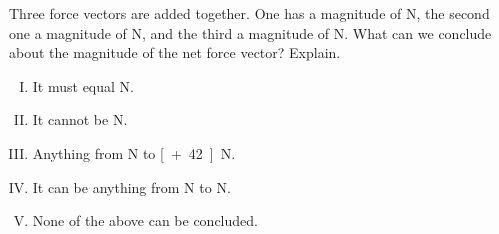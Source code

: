 \label{fnt6.1.2-1}Three force vectors are added together. One has a magnitude of \unit[9]{N}, the second one a magnitude of \unit[18]{N}, and the third a magnitude of \unit[15]{N}. What can we conclude about the magnitude of the net force vector?  Explain.

\begin{enumerate}[I.]
	\item It must equal \unit[42]{N}.
	
	\item It cannot be \unit[0]{N}.
	
	\item Anything from \unit[-42]{N} to \unit[+42]{N}.
	
	\item It can be anything from \unit[0]{N} to \unit[42]{N}.
	
	\item None of the above can be concluded.
\end{enumerate}